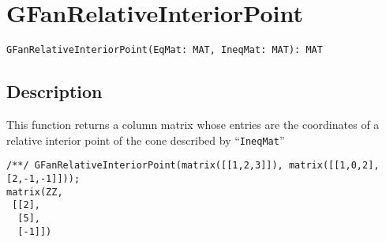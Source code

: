 \documentclass[a4paper]{mybook}
\newenvironment{command}{}{} %
\begin{document}
\section{GFanRelativeInteriorPoint}
\label{GFanRelativeInteriorPoint}
\begin{command} %


\begin{Verbatim}[label=syntax, rulecolor=\color{MidnightBlue},
frame=single]
GFanRelativeInteriorPoint(EqMat: MAT, IneqMat: MAT): MAT
\end{Verbatim}


\subsection*{Description}

This function returns a column matrix whose entries are the coordinates
of a relative interior point of the cone described by ``\verb&IneqMat&''
\begin{Verbatim}[label=example, rulecolor=\color{PineGreen}, frame=single]
/**/ GFanRelativeInteriorPoint(matrix([[1,2,3]]), matrix([[1,0,2],[2,-1,-1]]));
matrix(ZZ,
 [[2],
  [5],
  [-1]])
\end{Verbatim}


\end{command} %
\end{document}
